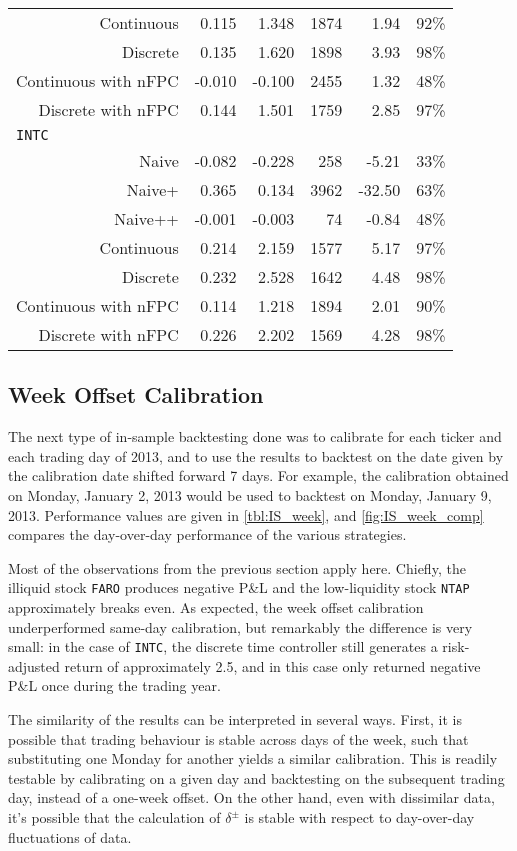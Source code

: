 \begin{table}
\begin{tabular}{@{} *{6}{r} @{}}
Continuous & 0.115 & 1.348 & 1874 & 1.94 & 92\% \\ 
Discrete & 0.135 & 1.620 & 1898 & 3.93 & 98\% \\ 
Continuous with nFPC & -0.010 & -0.100 & 2455 & 1.32 & 48\% \\ 
Discrete with nFPC & 0.144 & 1.501 & 1759 & 2.85 & 97\% \\[2ex]
\multicolumn{6}{l}{\texttt{INTC}} \\
Naive & -0.082 & -0.228 & 258 & -5.21 & 33\% \\ 
Naive+ & 0.365 & 0.134 & 3962 & -32.50 & 63\% \\ 
Naive++ & -0.001 & -0.003 & 74 & -0.84 & 48\% \\ 
Continuous & 0.214 & 2.159 & 1577 & 5.17 & 97\% \\ 
Discrete & 0.232 & 2.528 & 1642 & 4.48 & 98\% \\ 
Continuous with nFPC & 0.114 & 1.218 & 1894 & 2.01 & 90\% \\ 
Discrete with nFPC &  0.226 & 2.202 & 1569 & 4.28 & 98\% \\ 
\bottomrule
\end{tabular}
\end{table}

\FloatBarrier
\subsection{Week Offset Calibration}
The next type of in-sample backtesting done was to calibrate for each ticker and each trading day of 2013, and to use the results to backtest on the date given by the calibration date shifted forward 7 days. For example, the calibration obtained on Monday, January 2, 2013 would be used to backtest on Monday, January 9, 2013. Performance values are given in \autoref{tbl:IS_week}, and \autoref{fig:IS_week_comp} compares the day-over-day performance of the various strategies. 

Most of the observations from the previous section apply here. Chiefly, the illiquid stock \texttt{FARO} produces negative P\&L and the low-liquidity stock \texttt{NTAP} approximately breaks even. As expected, the week offset calibration underperformed same-day calibration, but remarkably the difference is very small: in the case of \texttt{INTC}, the discrete time controller still generates a risk-adjusted return of approximately 2.5, and in this case only returned negative P\&L once during the trading year. 

The similarity of the results can be interpreted in several ways. First, it is possible that trading behaviour is stable across days of the week, such that substituting one Monday for another yields a similar calibration. This is readily testable by calibrating on a given day and backtesting on the subsequent trading day, instead of a one-week offset. On the other hand, even with dissimilar data, it's possible that the calculation of $\delta^\pm$ is stable with respect to day-over-day fluctuations of data.

